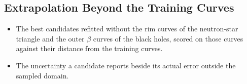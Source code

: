 \subsection{Extrapolation Beyond the Training Curves}
\label{sec:extrapolation}

\begin{itemize}
  \item The best candidates refitted without the rim curves of the neutron-star triangle and the outer $\beta$ curves of the black holes, scored on those curves against their distance from the training curves.
  \item The uncertainty a candidate reports beside its actual error outside the sampled domain.
\end{itemize}
